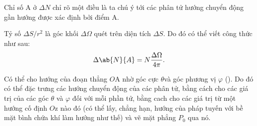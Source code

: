 \noindent
Chỉ số A ở $\Delta N$ chỉ rõ một điều là ta chú ý tới các phân tử hướng chuyển động gần hướng được xác định bởi điểm A.

Tỷ số $\Delta S/r^2$ là góc khối $\Delta \Omega$ quét trên diện tích $\Delta S$. Do đó có thể viết công thức  như sau:
\begin{equation}\label{eq:11_13}
	\Delta \ab{N}{A} = N\frac{\Delta\Omega}{4\pi}.
\end{equation}

\noindent
Có thể cho hướng của đoạn thẳng $O$A nhờ góc cực $\theta$và góc phương vị $\varphi$ (). Do đó có thể đặc trưng  các hướng chuyển động của các phân tử, bằng cách cho các giá trị của các góc $\theta$ và $\varphi$ đối với mỗi phần tử, bằng cach cho các giá trị từ một hướng cố định $O$z nào đó (có thể lấy, chẳng hạn, hướng của pháp tuyến với bề mặt bình chứa khí làm hướng như thế) và vẽ mặt phẳng $P_0$ qua nó.
